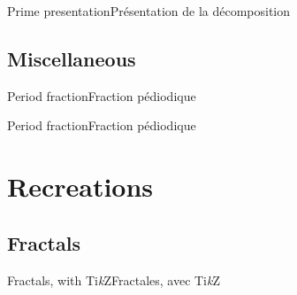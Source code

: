 \documentclass[a4paper,english,11pt]{article}
\providecommand\tikzlogo{Ti\textit{k}Z}
\let\TikZ\tikzlogo
\begin{document}
\begin{myprestex}{Prime presentation}{Présentation de la décomposition}
\\
\end{myprestex}

\subsection{Miscellaneous}

\begin{myprestexcode}{Period fraction}{Fraction pédiodique}

\end{myprestexcode}

\begin{myprestex}{Period fraction}{Fraction pédiodique}
\end{myprestex}

\newpage

\section{Recreations}

\subsection{Fractals}

\begin{myprestexcode}{Fractals, with \TikZ}{Fractales, avec \TikZ}

%
\end{myprestexcode}
\end{document}
